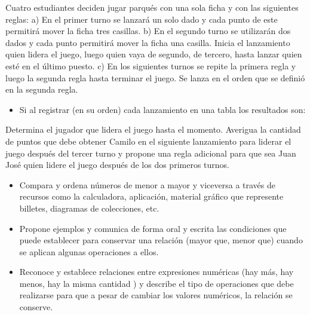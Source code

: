 \ejemplo

Cuatro estudiantes deciden jugar parqués con una sola ficha y con las siguientes reglas: a) En el primer turno se lanzará un solo dado y cada punto de este permitirá mover la ficha tres casillas. b) En el segundo turno se utilizarán dos dados y cada punto permitirá mover la ficha una casilla. Inicia el lanzamiento quien lidera el juego, luego quien vaya de segundo, de tercero, hasta lanzar quien esté en el último puesto. c) En los siguientes turnos se repite la primera regla y luego la segunda regla hasta terminar el juego. Se lanza en el orden que se definió en la segunda regla.

\begin{itemize}
  \item Si al registrar (en su orden) cada lanzamiento en una tabla los resultados son:
\end{itemize}

Determina el jugador que lidera el juego hasta el momento. Averigua la cantidad de puntos que debe obtener Camilo en el siguiente lanzamiento para liderar el juego después del tercer turno y propone una regla adicional para que sea Juan José quien lidere el juego después de los dos primeros turnos.


\evidencias

\begin{itemize}
  \item Compara y ordena números de menor a mayor y viceversa a través de recursos como la calculadora, aplicación, material gráfico que represente billetes, diagramas de colecciones, etc.
  \item Propone ejemplos y comunica de forma oral y escrita las condiciones que puede establecer para conservar una relación (mayor que, menor que) cuando se aplican algunas operaciones a ellos.
  \item Reconoce y establece relaciones entre expresiones numéricas (hay más, hay menos, hay la misma cantidad ) y describe el tipo de operaciones que debe realizarse para que a pesar de cambiar los valores numéricos, la relación se conserve.
\end{itemize}

